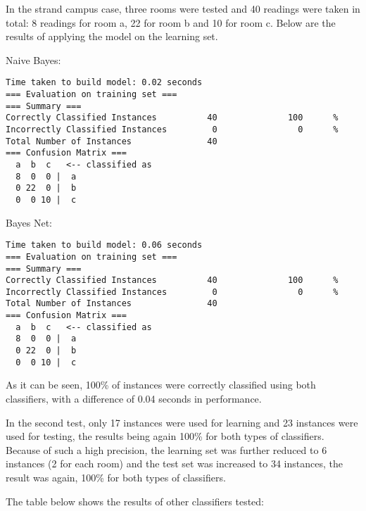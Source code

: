 In the strand campus case, three rooms were tested and 40 readings were taken in total: 8 readings for room a, 22 for room b and 10 for room c. Below are the results of applying the model on the learning set.

\noindent Naive Bayes:
\begin{lstlisting}
Time taken to build model: 0.02 seconds
=== Evaluation on training set ===
=== Summary ===
Correctly Classified Instances          40              100      %
Incorrectly Classified Instances         0                0      %
Total Number of Instances               40     
=== Confusion Matrix ===
  a  b  c   <-- classified as
  8  0  0 |  a
  0 22  0 |  b
  0  0 10 |  c
\end{lstlisting}

\noindent Bayes Net:
\begin{lstlisting}
Time taken to build model: 0.06 seconds
=== Evaluation on training set ===
=== Summary ===
Correctly Classified Instances          40              100      %
Incorrectly Classified Instances         0                0      %
Total Number of Instances               40     
=== Confusion Matrix ===
  a  b  c   <-- classified as
  8  0  0 |  a
  0 22  0 |  b
  0  0 10 |  c
\end{lstlisting}
As it can be seen, 100\% of instances were correctly classified using both classifiers, with a difference of 0.04 seconds in performance. 

In the second test, only 17 instances were used for learning and 23 instances were used for testing, the results being again 100\% for both types of classifiers. Because of such a high precision, the learning set was further reduced to 6 instances (2 for each room) and  the test set was increased to 34 instances, the result was again, 100\% for both types of classifiers.

The table below shows the results of other classifiers tested:

